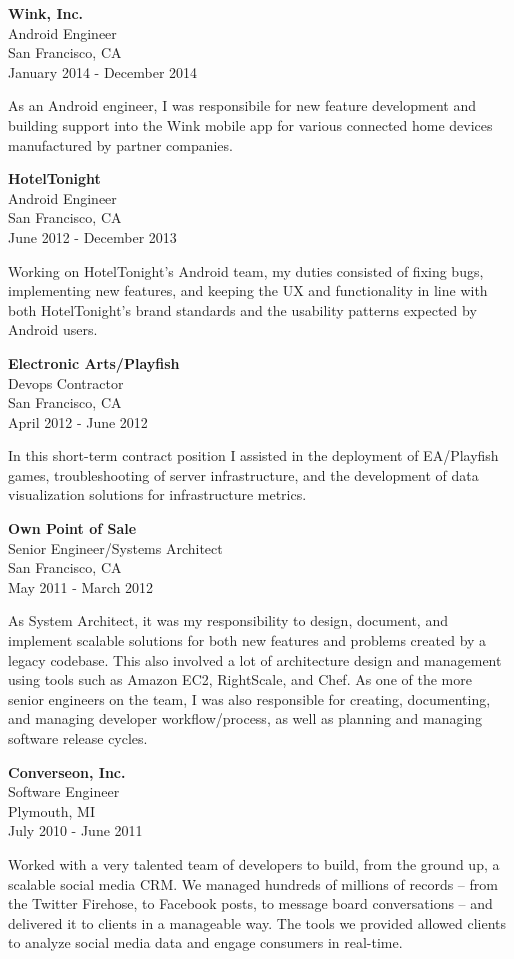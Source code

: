 \documentclass[]{article}
\begin{document}
\textbf{Wink, Inc.}\\
Android Engineer\\
San Francisco, CA\\
January 2014 - December 2014

As an Android engineer, I was responsibile for new feature development
and building support into the Wink mobile app for various connected home
devices manufactured by partner companies.

\textbf{HotelTonight}\\
Android Engineer\\
San Francisco, CA\\
June 2012 - December 2013

Working on HotelTonight's Android team, my duties consisted of fixing
bugs, implementing new features, and keeping the UX and functionality in
line with both HotelTonight's brand standards and the usability patterns
expected by Android users.

\textbf{Electronic Arts/Playfish}\\
Devops Contractor\\
San Francisco, CA\\
April 2012 - June 2012

In this short-term contract position I assisted in the deployment of
EA/Playfish games, troubleshooting of server infrastructure, and the
development of data visualization solutions for infrastructure metrics.

\textbf{Own Point of Sale}\\
Senior Engineer/Systems Architect\\
San Francisco, CA\\
May 2011 - March 2012

As System Architect, it was my responsibility to design, document, and
implement scalable solutions for both new features and problems created
by a legacy codebase. This also involved a lot of architecture design
and management using tools such as Amazon EC2, RightScale, and Chef. As
one of the more senior engineers on the team, I was also responsible for
creating, documenting, and managing developer workflow/process, as well
as planning and managing software release cycles.

\textbf{Converseon, Inc.}\\
Software Engineer\\
Plymouth, MI\\
July 2010 - June 2011

Worked with a very talented team of developers to build, from the ground
up, a scalable social media CRM. We managed hundreds of millions of
records -- from the Twitter Firehose, to Facebook posts, to message
board conversations -- and delivered it to clients in a manageable way.
The tools we provided allowed clients to analyze social media data and
engage consumers in real-time.
\end{document}
